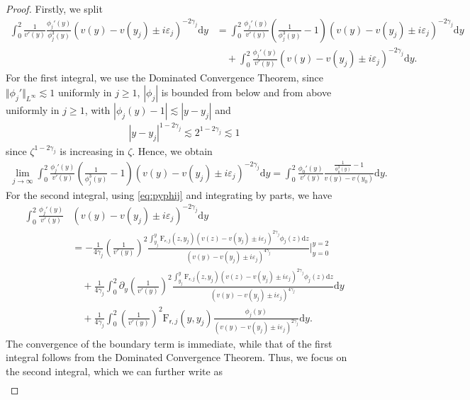 \documentclass[11pt,reqno]{amsproc}
\theoremstyle{definition}
\numberwithin{equation}{section}
\newcommand{\sr}{{\mathsf{r}}}
\renewcommand{\d}{\mathrm{d}}
\newcommand{\ep}{\varepsilon}
\begin{document}
\begin{proof}
Firstly, we split
\begin{align*}
\int_0^2 \frac{1}{v'(y)}\frac{\phi_j'(y)}{\phi_j^3(y)} (v(y) - v(y_j) \pm i\ep_j)^{-2\gamma_j} \d y &= \int_0^2 \frac{\phi_j'(y)}{v'(y)}\left( \frac{1}{\phi_j^3(y)} - 1 \right) (v(y) - v(y_j) \pm i\ep_j)^{-2\gamma_j} \d y \\
&\quad + \int_0^2 \frac{\phi_j'(y)}{v'(y)}(v(y) - v(y_j) \pm i\ep_j)^{-2\gamma_j} \d y .
\end{align*}
For the first integral, we use the Dominated Convergence Theorem, since $\Vert \phi_j' \Vert_{L^\infty}\lesssim 1$ uniformly in $j\geq 1$, $|\phi_j|$ is bounded from below and from above uniformly in $j\geq 1$, with $|\phi_j(y) -1 |\lesssim |y-y_j|$ and 
\begin{align*}
|y-y_j|^{1-2\gamma_j}\lesssim 2^{1-2\gamma_j}\lesssim 1
\end{align*}
since $\zeta^{1-2\gamma_j}$ is increasing in $\zeta$. Hence, we obtain
\begin{align*}
\lim_{j\rightarrow \infty}\int_0^2 \frac{\phi_j'(y)}{v'(y)}\left( \frac{1}{\phi_j^3(y)} - 1 \right) (v(y) - v(y_j) \pm i\ep_j)^{-2\gamma_j} \d y = \int_0^2 \frac{\phi_0'(y)}{v'(y)}\frac{ \frac{1}{\phi_0^3(y)} - 1}{v(y) - v(y_0)} \d y.
\end{align*}
For the second integral, using \eqref{eq:pyphij} and integrating by parts, we have
\begin{align*}
\int_0^2 \frac{\phi_j'(y)}{v'(y)} &(v(y) - v(y_j) \pm i\ep_j)^{-2\gamma_j} \d y \\
&= -\frac{1}{4\gamma_j} \left(\frac{1}{v'(y)}\right)^2 \frac{\int_{y_j}^y \mathrm{F}_{\sr,j}(z,y_j)(v(z)-v(y_j)\pm i\ep_j)^{2\gamma_j}\phi_j(z) \d z}{(v(y) - v(y_j) \pm i\ep_j)^{4\gamma_j}}\Big|_{y=0}^{y=2} \\
&\quad + \frac{1}{4\gamma_j}\int_0^2 \partial_y\left(\frac{1}{v'(y)}\right)^2 \frac{\int_{y_j}^y \mathrm{F}_{\sr,j}(z,y_j)(v(z)-v(y_j)\pm i\ep_j)^{2\gamma_j}\phi_j(z) \d z}{(v(y) - v(y_j) \pm i\ep_j)^{4\gamma_j}} \d y \\
&\quad + \frac{1}{4\gamma_j}\int_0^2 \left( \frac{1}{v'(y)} \right)^2 \mathrm{F}_{\sr, j}(y,y_j)\frac{\phi_j(y)}{(v(y) - v(y_j) \pm i\ep_j)^{2\gamma_j}} \d y.
\end{align*}
The convergence of the boundary term is immediate, while that of the first integral follows from the Dominated Convergence Theorem. Thus, we focus on the second integral, which we can further write as
\begin{align*}

\end{align*}
\end{proof}
\end{document}
